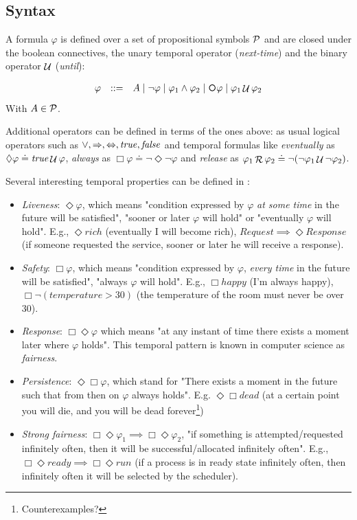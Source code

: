 \subsection{Syntax}
A \LTL formula $\varphi$ is defined over a set of propositional symbols $\mathcal{P}$ and are closed under the boolean connectives, the unary temporal operator \Next (\emph{next-time}) and the binary operator $\mathop{\mathcal{U}}$ (\emph{until}):

\[\begin{array}{rcl}
\varphi &::=& A \mid \lnot \varphi \mid \varphi_1\land \varphi_2 \mid \Next\varphi \mid \varphi_1 \Until \varphi_2
\end{array}
\]
With $A\in \mathcal{P}$.

Additional operators can be defined in terms of the ones above: as usual logical operators such as $\vee, \Rightarrow, \Leftrightarrow, \mathit{true}, \mathit{false}$ and temporal formulas like \emph{eventually} as $\Diamond \varphi \doteq \mathit{true} \mathop{\mathcal{U}} \varphi$, \emph{always} as $\Box \varphi \doteq \lnot \Diamond \lnot \varphi$ and \emph{release} as $\varphi_1 \mathop{\mathcal{R}} \varphi_2 \doteq \lnot (\lnot \varphi_1 \mathop{\mathcal{U}} \lnot \varphi_2)$.

\begin{example}\label{ltl-formula-examples}
Several interesting temporal properties can be defined in \LTL:
\begin{itemize}
	\item \emph{Liveness}: $\Diamond \varphi$, which means "condition expressed by $\varphi$ \emph{at some time} in the future will be satisfied", "sooner or later $\varphi$ will hold" or "eventually $\varphi$ will hold". E.g., $\Diamond rich$ (eventually I will become rich), $Request \implies \Diamond Response$ (if someone requested the service, sooner or later he will receive a response).
	\item \emph{Safety}: $\Box \varphi$, which means "condition expressed by $\varphi$, \emph{every time} in the future will be satisfied", "always $\varphi$ will hold". E.g., $\Box happy$ (I'm always happy), $\Box \lnot (temperature >30)$ (the temperature of the room must never be over 30).
	\item \emph{Response}: $\Box \Diamond \varphi$ which means "at any instant of time there exists a moment later where $\varphi$ holds". This temporal pattern is known in computer science as \emph{fairness}.
	\item \emph{Persistence}: $\Diamond \Box \varphi$, which stand for "There exists a moment in the future such that from then on $\varphi$ always holds". E.g. $\Diamond \Box dead$ (at a certain point you will die, and you will be dead forever\footnote{Counterexamples?})
	\item \emph{Strong fairness}: $\Box \Diamond \varphi_1 \implies \Box \Diamond \varphi_2$, "if something is attempted/requested infinitely often, then it will be successful/allocated infinitely often". E.g., $\Box \Diamond ready \implies \Box \Diamond run$ (if a process is in ready state infinitely often, then infinitely often it will be selected by the scheduler).
\end{itemize}
\end{example}

